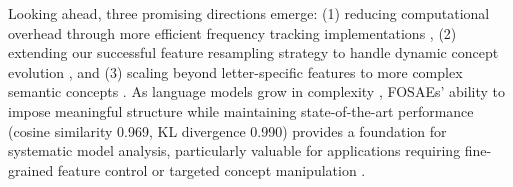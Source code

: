 \documentclass{article} %
\begin{document}
Looking ahead, three promising directions emerge: (1) reducing computational overhead through more efficient frequency tracking implementations \cite{mudideEfficientDictionaryLearning2024a}, (2) extending our successful feature resampling strategy to handle dynamic concept evolution \cite{ghilardiEfficientTrainingSparse2024a}, and (3) scaling beyond letter-specific features to more complex semantic concepts \cite{marksSparseFeatureCircuits2024}. As language models grow in complexity \cite{gpt4}, FOSAEs' ability to impose meaningful structure while maintaining state-of-the-art performance (cosine similarity 0.969, KL divergence 0.990) provides a foundation for systematic model analysis, particularly valuable for applications requiring fine-grained feature control \cite{liWMDPBenchmarkMeasuring2024} or targeted concept manipulation \cite{farrell2024applying}.



\end{document}
